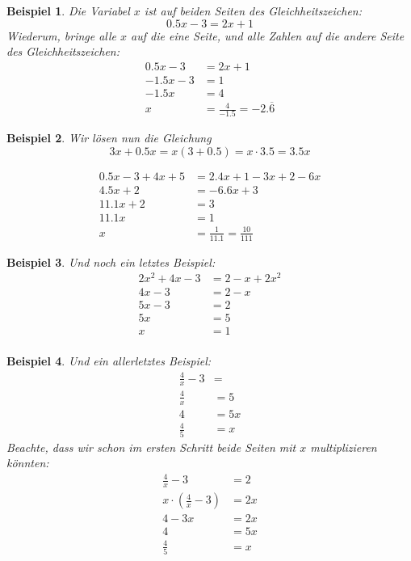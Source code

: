 \documentclass[%
11pt,%
twoside,%
titlepage,%
swissgerman,%
headsepline%
]{scrartcl}
\theoremstyle{definition}
\newtheorem{bsp}{Beispiel}[subsection] %
\theoremstyle{plain}
\newtheorem{bsp}{Beispiel}[subsection] %
\theoremstyle{plain}
\begin{document}
	\begin{bsp} Die Variabel $x$ ist auf beiden Seiten des Gleichheitszeichen: $$0.5 x-3 = 2 x+1$$ Wiederum, bringe alle $x$ auf die eine Seite, und alle Zahlen auf die andere Seite des Gleichheitszeichen:
		\begin{align*}
			0.5 x-3 & = 2 x+1\tag{$-2x$}\\
			-1.5 x -3 & = 1 \tag{$+3$}\\
			-1.5 x & =4 \tag{$\div-1.5$}\\
			x & = \frac{4}{-1.5}={-2.\overline{6}}
		\end{align*}
	\end{bsp}
	
	\begin{bsp}
		Wir lösen nun die Gleichung
		$$3x+0.5x=x(3+0.5)=x\cdot 3.5=3.5x$$
		
		\begin{align*}
			0.5 x-3 +4x +5& = 2.4 x+1 -3x+2-6x\\
			4.5 x +2 & = -6.6x +3\tag{$+6.6x$}\\
			11.1 x +2 & = 3\tag{$-2$}\\
			11.1 x & =1\tag{$\div11.1$}\\
			x & = \frac{1}{11.1}=\frac{10}{111}
		\end{align*}
	\end{bsp}           
	
	\begin{bsp}
		Und noch ein letztes Beispiel:
		\begin{align*}
			2x^2+4x-3 &=  2-x+2x^2 \tag{$-2x^2$}\\
			4x -3 & = 2-x\tag{$+x$}\\
			5x -3 & = 2\tag{$+3$}\\
			5x & = 5\tag{$\div5$}\\
			x &= {1}\\
		\end{align*}
	\end{bsp}           
	
	\begin{bsp}
		Und ein allerletztes Beispiel: 
		\begin{align*}
			\frac{4}{x}-3 &= \tag{$+3$}\\
			\frac{4}{x} & = 5\tag{$\cdot x$}\\
			4 & =  5x\tag{$\div5$}\\
			{\frac{4}{5}}& = x  
		\end{align*}
		Beachte, dass wir schon im ersten Schritt beide Seiten mit $x$ multiplizieren könnten:
		\begin{align*}
			\frac{4}{x}-3 &= 2\tag{$\cdot x$}\\
			x\cdot (\frac{4}{x}-3) & = 2x \\
			4-3x & = 2x\tag{$+3x$}\\
			4 & =  5x\tag{$\div5$}\\
			{\frac{4}{5}}& = x  
		\end{align*}
	\end{bsp}
	
\end{document}
